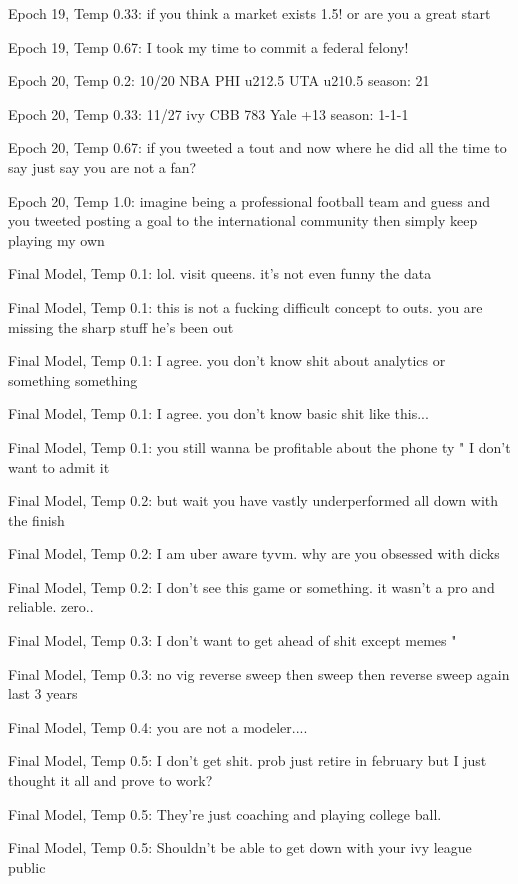 \documentclass[5p,authoryear]{elsarticle}
\begin{document}
Epoch 19, Temp 0.33:
if you think a market exists 1.5! or are you a great start 

Epoch 19, Temp 0.67:
I took my time to commit a federal felony! 

Epoch 20, Temp 0.2:
10/20 NBA PHI u212.5 UTA u210.5 season: 21%

Epoch 20, Temp 0.33:
11/27 ivy CBB 783 Yale +13 season: 1-1-1 

Epoch 20, Temp 0.67:
if you tweeted a tout and now where he did all the time to say just say you are not a fan? 

Epoch 20, Temp 1.0:
imagine being a professional football team and guess and you tweeted posting a goal to the international community then simply keep playing my own 

Final Model, Temp 0.1:
lol. visit queens. it's not even funny the data 

Final Model, Temp 0.1:
this is not a fucking difficult concept to outs. you are missing the sharp stuff he's been out 

Final Model, Temp 0.1:
I agree. you don’t know shit about analytics or something something 

Final Model, Temp 0.1:
I agree. you don’t know basic shit like this... 

Final Model, Temp 0.1: you still wanna be profitable about the phone ty " I don't want to admit it 

Final Model, Temp 0.2:
but wait you have vastly underperformed all down with the finish 

Final Model, Temp 0.2:
I am uber aware tyvm. why are you obsessed with dicks 

Final Model, Temp 0.2:
I don't see this game or something. it wasn't a pro and reliable. zero..

Final Model, Temp 0.3:
I don't want to get ahead of shit except memes " 

Final Model, Temp 0.3:
no vig reverse sweep then sweep then reverse sweep again last 3 years 

Final Model, Temp 0.4:
you are not a modeler....

Final Model, Temp 0.5:
I don't get shit. prob just retire in february but I just thought it all and prove to work? 

Final Model, Temp 0.5:
They’re just coaching and playing college ball. 

Final Model, Temp 0.5:
Shouldn’t be able to get down with your ivy league public 
\end{document}
